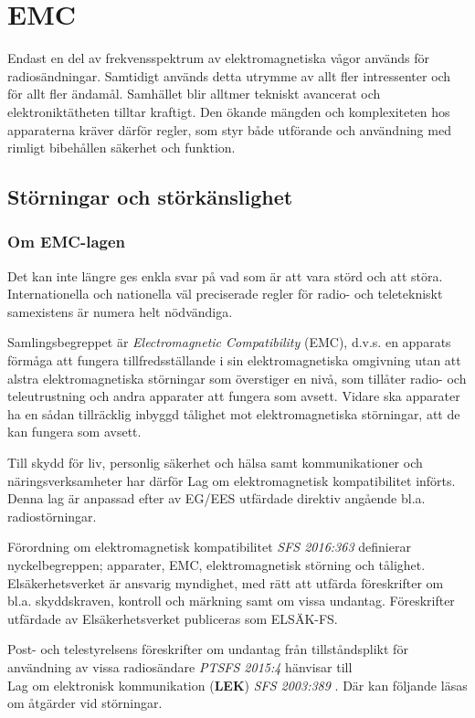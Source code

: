 \chapter{EMC}

Endast en del av frekvensspektrum av elektromagnetiska vågor används för
radiosändningar.
Samtidigt används detta utrymme av allt fler intressenter och för allt fler
ändamål.
Samhället blir alltmer tekniskt avancerat och elektroniktätheten tilltar
kraftigt.
Den ökande mängden och komplexiteten hos apparaterna kräver därför regler, som
styr både utförande och användning med rimligt bibehållen säkerhet och funktion.

\section{Störningar och störkänslighet}

\subsection{Om EMC-lagen}
\label{EMC-lagen}

Det kan inte längre ges enkla svar på vad som är att vara störd och att störa.
Internationella och nationella väl preciserade regler för radio- och
teletekniskt samexistens är numera helt nödvändiga.

Samlingsbegreppet är \emph{Electromagnetic Compatibility} (EMC), d.v.s. en
apparats förmåga att fungera tillfredsställande i sin elektromagnetiska
omgivning utan att alstra elektromagnetiska störningar som överstiger en nivå,
som tillåter radio- och teleutrustning och andra apparater att fungera som
avsett.
Vidare ska apparater ha en sådan tillräcklig inbyggd tålighet mot
elektromagnetiska störningar, att de kan fungera som avsett.

Till skydd för liv, personlig säkerhet och hälsa samt kommunikationer och
näringsverksamheter har därför Lag om elektromagnetisk kompatibilitet införts.
Denna lag är anpassad efter av EG/EES utfärdade direktiv angående bl.a.
radiostörningar.

Förordning om elektromagnetisk kompatibilitet \emph{SFS 2016:363}
\cite{SFS2016:363} definierar nyckelbegreppen; apparater, EMC, elektromagnetisk
störning och tålighet.
Elsäkerhetsverket är ansvarig myndighet, med rätt att utfärda föreskrifter om
bl.a. skyddskraven, kontroll och märkning samt om vissa undantag.
Föreskrifter utfärdade av Elsäkerhetsverket publiceras som ELSÄK-FS.

Post- och telestyrelsens föreskrifter om undantag från tillståndsplikt för
användning av vissa radiosändare \emph{PTSFS 2015:4} \cite{PTSFS2015:4} hänvisar
till\\
Lag om elektronisk kommunikation (\textbf{LEK}) \emph{SFS 2003:389}
\cite{SFS2003:389}.
Där kan följande läsas om åtgärder vid störningar.

